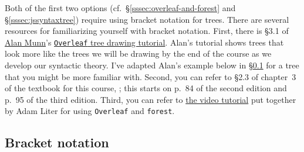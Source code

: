 \documentclass[11pt]{article}
\newcommand*{\Package}[1]{\texttt{#1}}
\newcommand*{\Software}[1]{\texttt{#1}}
\begin{document}
Both of the first two options (cf.~\S\ref{sssec:overleaf-and-forest} and
\S\ref{sssec:jssyntaxtree}) require using bracket notation for trees.
There are several resources for familiarizing yourself with bracket
notation.  First, there is \S3.1 of \href{https://msu.edu/~amunn/}{Alan
  Munn}'s
\href{https://msu.edu/~amunn/latex/overleaf-trees-forest.pdf}{\Software{Overleaf}
  tree drawing tutorial}.  Alan's tutorial shows trees that look more
like the trees we will be drawing by the end of the course as we develop
our syntactic theory.  I've adapted Alan's example below in
\S\ref{ssec:bracket-notation} for a tree that you might be more familiar
with.  Second, you can refer to \S2.3 of chapter~3 of the textbook for
this course, \textcite{carnie2002,carnie2007,carnie2013}; this starts on
p.~84 of the second edition and p.~95 of the third edition.  Third, you
can refer to
\href{https://umd.instructure.com/courses/1278736/files/55284562}{the
  video tutorial} put together by Adam Liter for using
\Software{Overleaf} and \Package{forest}.

\subsection{Bracket notation}
\label{ssec:bracket-notation}
\end{document}
